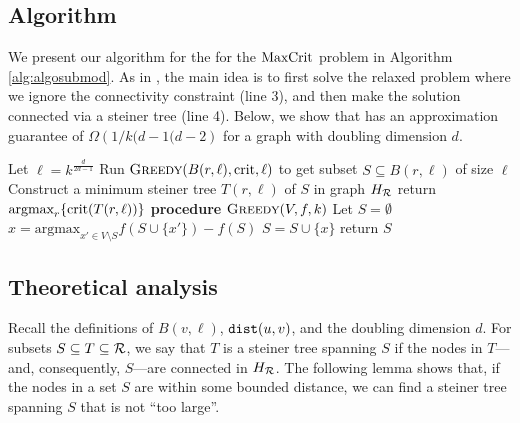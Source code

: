\subsection{Algorithm \algosubmod{}}
We present our algorithm for the for the $\text{MaxCrit}{}$ problem in Algorithm \ref{alg:algosubmod}. As in \cite{kuo2015maximizing}, the main idea is to first solve the relaxed problem where we ignore the connectivity constraint (line 3), and then make the solution connected via a steiner tree (line 4). Below, we show that \algosubmod{} has an approximation guarantee of $\Omega(1 / k{(d - 1}{(d-2})$ for a graph with doubling dimension $d$.

\begin{algorithm}{}
\caption{\small $\algosubmod(H_{\R}, k, d)$}
\label{alg:algosubmod}
\begin{algorithmic}[1]
\begin{small}
\STATE Let $\ell = k^{\frac{d}{2d -1}}$
  \STATE 
Run $\textsc{Greedy}(B(r, \ell), \text{crit}, \ell)$ to get subset $S\subseteq B(r, \ell)$ of size $\ell$
  \STATE Construct a minimum steiner tree $T(r, \ell)$ of $S$ in graph $H_{\mathcal{R}}$
\ENDFOR
\STATE return $\mbox{argmax}_{r} \{\text{crit}(T(r, \ell))\}$
\STATE
\STATE\textbf{procedure} $\textsc{Greedy}(V, f, k)$ \cite{nemhauser1978analysis}
\STATE Let $S = \emptyset$
\STATE $x = \mbox{argmax}_{x' \in V\setminus S} f(S \cup \{x'\}) - f(S)$
\STATE $S = S \cup \{x\}$
\ENDFOR
\STATE return $S$
\end{small}
\end{algorithmic}
\end{algorithm}

\subsection{Theoretical analysis}
Recall the definitions of $B(v, \ell)$, $\texttt{dist}(u, v)$, and the doubling dimension $d$. For subsets $S\subseteq T \subseteq \mathcal{R}$, we say that $T$ is a steiner tree spanning $S$ if the nodes in $T$---and, consequently, $S$---are connected in $H_{\mathcal{R}}$. The following lemma shows that, if the nodes in a set $S$ are within some bounded distance, we can find a steiner tree spanning $S$ that is not ``too large''.

